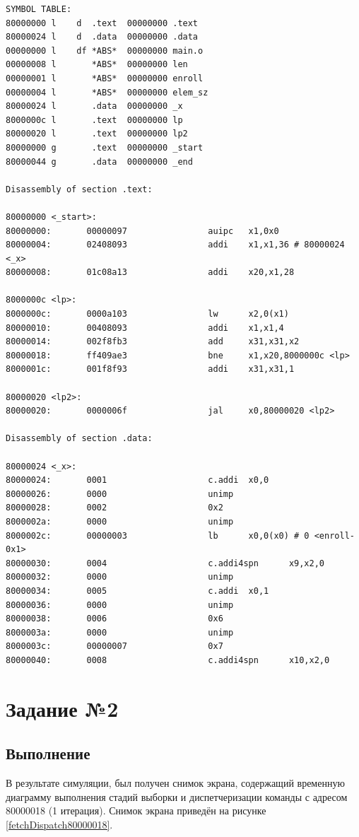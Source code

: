 \documentclass[12pt]{report}
\begin{document}
\begin{lstlisting}[label=disasmListing,caption=Дизассемблерный листинг кода программы]
SYMBOL TABLE:
80000000 l    d  .text  00000000 .text
80000024 l    d  .data  00000000 .data
00000000 l    df *ABS*  00000000 main.o
00000008 l       *ABS*  00000000 len
00000001 l       *ABS*  00000000 enroll
00000004 l       *ABS*  00000000 elem_sz
80000024 l       .data  00000000 _x
8000000c l       .text  00000000 lp
80000020 l       .text  00000000 lp2
80000000 g       .text  00000000 _start
80000044 g       .data  00000000 _end

Disassembly of section .text:

80000000 <_start>:
80000000:       00000097                auipc   x1,0x0
80000004:       02408093                addi    x1,x1,36 # 80000024 <_x>
80000008:       01c08a13                addi    x20,x1,28

8000000c <lp>:
8000000c:       0000a103                lw      x2,0(x1)
80000010:       00408093                addi    x1,x1,4
80000014:       002f8fb3                add     x31,x31,x2
80000018:       ff409ae3                bne     x1,x20,8000000c <lp>
8000001c:       001f8f93                addi    x31,x31,1

80000020 <lp2>:
80000020:       0000006f                jal     x0,80000020 <lp2>

Disassembly of section .data:

80000024 <_x>:
80000024:       0001                    c.addi  x0,0
80000026:       0000                    unimp
80000028:       0002                    0x2
8000002a:       0000                    unimp
8000002c:       00000003                lb      x0,0(x0) # 0 <enroll-0x1>
80000030:       0004                    c.addi4spn      x9,x2,0
80000032:       0000                    unimp
80000034:       0005                    c.addi  x0,1
80000036:       0000                    unimp
80000038:       0006                    0x6
8000003a:       0000                    unimp
8000003c:       00000007                0x7
80000040:       0008                    c.addi4spn      x10,x2,0

\end{lstlisting}

\newpage
\chapter{Задание №2}
\section{Выполнение}
В результате симуляции, был получен снимок экрана, содержащий временную диаграмму выполнения стадий выборки и диспетчеризации команды с адресом 80000018 (1 итерация). Снимок экрана приведён на рисунке \ref{fetchDispatch80000018}.
\end{document}
